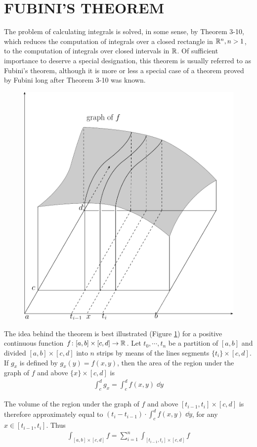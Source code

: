 \newpage
\section[\textsc{fubini's theorem}]{FUBINI'S THEOREM}
The problem of calculating integrals is solved, in some sense,
by Theorem 3-10, which reduces the computation of integrals over a closed 
rectangle in $\mathbb{R}^n, n > 1$, to the computation of integrals over closed intervals in $\mathbb{R}$.
Of sufficient importance to deserve a special designation, this theorem is usually
referred to as Fubini's theorem, although it is more or less a special case of a 
theorem proved by Fubini long after Theorem 3-10 was known.

\begin{figure}[htb]
    \centering
    \includegraphics[width=.7\linewidth]{./pics/Fig3-2.pdf}
    \caption{}
    \label{Fig 3-2}
\end{figure}

The idea behind the theorem is best illustrated (Figure \ref{Fig 3-2})
for a positive continuous function  $f\colon{}[a,b]\times [c, d]\to \mathbb{R}$. Let $t_0, \cdots, t_n$ 
be a partition of $[a, b]$ and divided $[a, b]\times [c, d]$ into $n$ strips by means of the 
lines segments $\{t_i\}\times [c, d]$. If $g_x$ is defined by $g_x(y) = f(x, y)$, then the area 
of the region under the graph of $f$ and above $\{x\}\times [c, d]$ is 
\begin{align*}
  \int_{c }^{d}{g_x} = \int_c^df(x, y)\;\dd y
\end{align*}

The volume of the region under the graph of $f$ and above $[t_{i-1},t_i] \times [c,d]$ 
is therefore approximately equal to $(t_i-t_{i-1})\cdot \int_c^d f(x,y)\;\dd y$, for any $x\in [t_{i-1}, t_i]$.
Thus 
\begin{align*}
  \int_{[a,b]\times [c, d]} f  = \sum_{i=1}^{n}{\int_{[t_{i-1}, t_i]\times [c, d] }f }
\end{align*}

